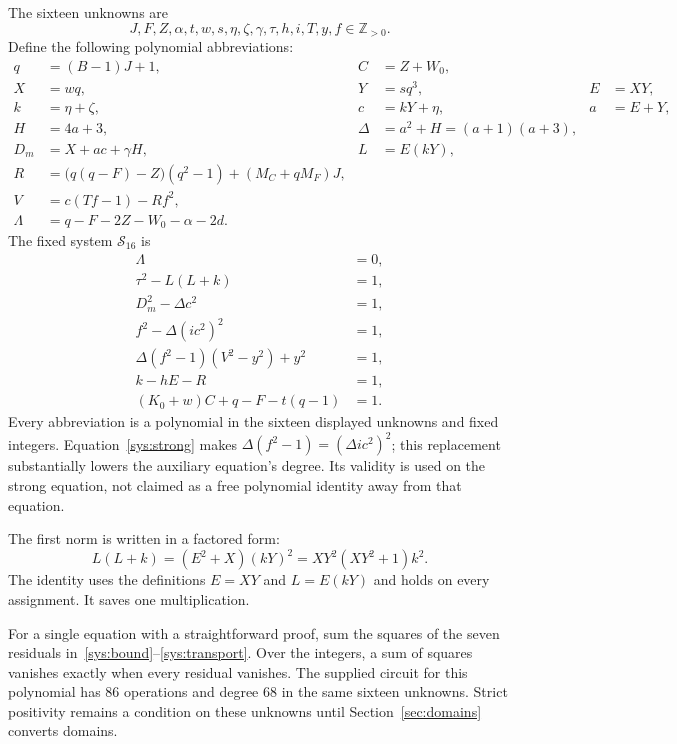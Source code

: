 \documentclass[11pt]{article}
\newcommand{\Pos}{\mathbb Z_{>0}}
\theoremstyle{remark}\newtheorem{remark}[theorem]{Remark}
\begin{document}
The sixteen unknowns are
\[
 J,F,Z,\alpha,t,w,s,\eta,\zeta,\gamma,\tau,h,i,T,y,f\in\Pos.
\]
Define the following polynomial abbreviations:
\begin{align}
 q&=(B-1)J+1,& C&=Z+W_0,\label{eq:qC}\\
 X&=wq,&Y&=sq^3,&E&=XY,\nonumber\\
 k&=\eta+\zeta,&c&=kY+\eta,&a&=E+Y,\nonumber\\
 H&=4a+3,&\Delta&=a^2+H=(a+1)(a+3),\nonumber\\
 D_m&=X+ac+\gamma H,&L&=E(kY),\nonumber\\
 R&=\bigl(q(q-F)-Z\bigr)(q^2-1)+(M_C+qM_F)J,\label{eq:R}\\
 V&=c(Tf-1)-Rf^2,\nonumber\\
 \Lambda&=q-F-2Z-W_0-\alpha-2d.\label{eq:Lambda}
\end{align}
The fixed system $\mathcal S_{16}$ is
\begin{align}
 \Lambda&=0,\label{sys:bound}\\
 \tau^2-L(L+k)&=1,\label{sys:first}\\
 D_m^2-\Delta c^2&=1,\label{sys:main}\\
 f^2-\Delta (ic^2)^2&=1,\label{sys:strong}\\
 \Delta(f^2-1)(V^2-y^2)+y^2&=1,\label{sys:aux}\\
 k-hE-R&=1,\label{sys:index}\\
 (K_0+w)C+q-F-t(q-1)&=1.\label{sys:transport}
\end{align}
Every abbreviation is a polynomial in the sixteen displayed unknowns and fixed integers. Equation~\eqref{sys:strong} makes $\Delta(f^2-1)=(\Delta ic^2)^2$; this replacement substantially lowers the auxiliary equation's degree. Its validity is used on the strong equation, not claimed as a free polynomial identity away from that equation.

The first norm is written in a factored form:
\[
 L(L+k)=(E^2+X)(kY)^2=XY^2(XY^2+1)k^2.
\]
The identity uses the definitions $E=XY$ and $L=E(kY)$ and holds on every assignment. It saves one multiplication.

For a single equation with a straightforward proof, sum the squares of the seven residuals in~\eqref{sys:bound}--\eqref{sys:transport}. Over the integers, a sum of squares vanishes exactly when every residual vanishes. The supplied circuit for this polynomial has $86$ operations and degree $68$ in the same sixteen unknowns. Strict positivity remains a condition on these unknowns until Section~\ref{sec:domains} converts domains.
\end{document}
